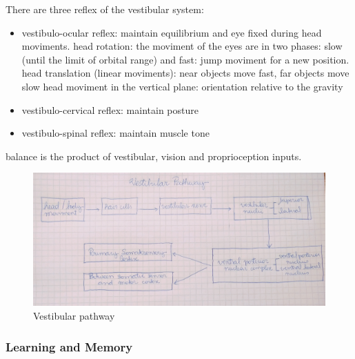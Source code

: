 \documentclass[12pt,article,oneside,a4paper]{memoir}
\begin{document}
\begin{enumerate}
There are three reflex of the vestibular system:
\begin{itemize}
\item vestibulo-ocular reflex: maintain equilibrium and eye fixed during head moviments. 
\subitem head rotation: the moviment of the eyes are in two phases: slow (until the limit of orbital range) and fast: jump moviment for a new position.
\subitem head translation (linear moviments): near objects move fast, far objects move slow
\subitem head moviment in the vertical plane: orientation relative to the gravity
\item vestibulo-cervical reflex: maintain posture
\item vestibulo-spinal reflex: maintain muscle tone
\end{itemize}

balance is the product of vestibular, vision and proprioception inputs.

\begin{figure}[H]
	\centering
  	\includegraphics[width=0.8\linewidth]{imgs/vestibular-pathway.jpg}
	\caption{Vestibular pathway}
  	\label{fig:vestibular-pathway}
\end{figure}

\end{enumerate}

\subsubsection{Learning and Memory}
\end{document}
